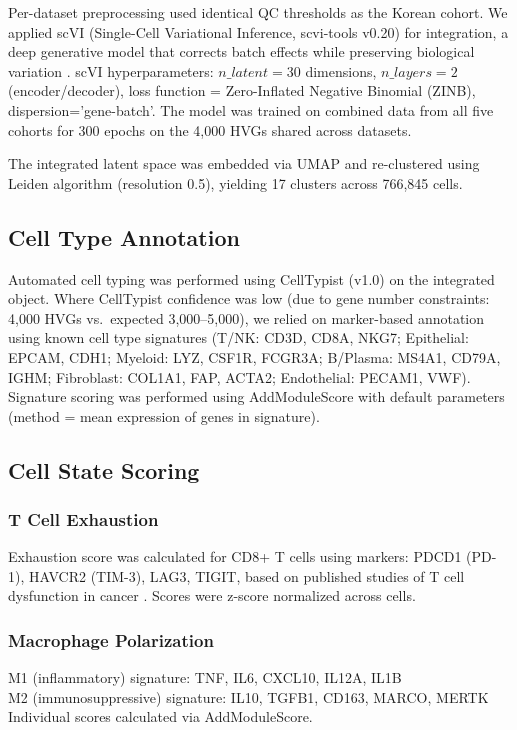 \documentclass[12pt,twoside]{article}
\begin{document}
Per-dataset preprocessing used identical QC thresholds as the Korean cohort. We applied scVI (Single-Cell Variational Inference, scvi-tools v0.20) for integration, a deep generative model that corrects batch effects while preserving biological variation \cite{Lopez2018}. scVI hyperparameters: $n\_latent=30$ dimensions, $n\_layers=2$ (encoder/decoder), loss function = Zero-Inflated Negative Binomial (ZINB), dispersion='gene-batch'. The model was trained on combined data from all five cohorts for 300 epochs on the 4,000 HVGs shared across datasets.

The integrated latent space was embedded via UMAP and re-clustered using Leiden algorithm (resolution 0.5), yielding 17 clusters across 766,845 cells.

\subsection{Cell Type Annotation}

Automated cell typing was performed using CellTypist (v1.0) on the integrated object. Where CellTypist confidence was low (due to gene number constraints: 4,000 HVGs vs.\ expected 3,000--5,000), we relied on marker-based annotation using known cell type signatures (T/NK: CD3D, CD8A, NKG7; Epithelial: EPCAM, CDH1; Myeloid: LYZ, CSF1R, FCGR3A; B/Plasma: MS4A1, CD79A, IGHM; Fibroblast: COL1A1, FAP, ACTA2; Endothelial: PECAM1, VWF). Signature scoring was performed using AddModuleScore with default parameters (method = mean expression of genes in signature).

\subsection{Cell State Scoring}

\subsubsection{T Cell Exhaustion}
Exhaustion score was calculated for CD8+ T cells using markers: PDCD1 (PD-1), HAVCR2 (TIM-3), LAG3, TIGIT, based on published studies of T cell dysfunction in cancer \cite{Wherry2011, Thommen2017}. Scores were z-score normalized across cells.

\subsubsection{Macrophage Polarization}
M1 (inflammatory) signature: TNF, IL6, CXCL10, IL12A, IL1B \\
M2 (immunosuppressive) signature: IL10, TGFB1, CD163, MARCO, MERTK \\
Individual scores calculated via AddModuleScore.
\end{document}
